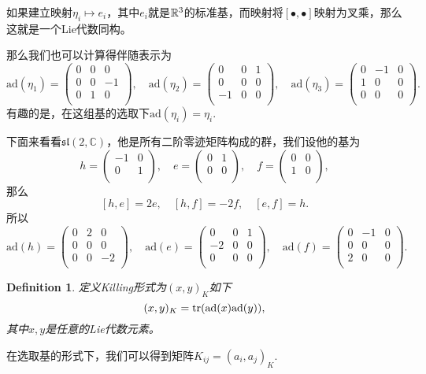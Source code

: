\documentclass[9pt]{extbook}
\theoremstyle{plain}
\newtheorem{defi}{Definition}
\newcommand{\cc}{\mathbb{C}}
\newcommand{\ad}{{\mathrm{ad}}}
\begin{document}
如果建立映射$\eta_i\mapsto e_i$，其中$e_i$就是$\mathbb{R}^3$的标准基，而映射将$[\bullet,\bullet]$映射为叉乘，那么这就是一个Lie代数同构。

那么我们也可以计算得伴随表示为
\[
	\ad(\eta_1)=
		\begin{pmatrix}
			0&0&0\\
			0&0&-1\\
			0&1&0\\
		\end{pmatrix},\quad
	\ad(\eta_2)=
		\begin{pmatrix}
			0&0&1\\
			0&0&0\\
			-1&0&0\\
		\end{pmatrix},\quad
	\ad(\eta_3)=
		\begin{pmatrix}
			0&-1&0\\
			1&0&0\\
			0&0&0\\
		\end{pmatrix}.
\]
有趣的是，在这组基的选取下$\ad(\eta_i)=\eta_i$.

下面来看看$\mathfrak{sl}(2,\cc)$，他是所有二阶零迹矩阵构成的群，我们设他的基为
\[
h=\begin{pmatrix}
	-1&0\\
	0&1\\
\end{pmatrix},\quad
e=\begin{pmatrix}
	0&1\\
	0&0\\
\end{pmatrix},\quad
f=\begin{pmatrix}
	0&0\\
	1&0\\
\end{pmatrix},
\]
那么
\[
[h,e]=2e,\quad[h,f]=-2f,\quad[e,f]=h.
\]
所以
\[
	\ad(h)=
		\begin{pmatrix}
			0&2&0\\
			0&0&0\\
			0&0&-2\\
		\end{pmatrix},\quad
	\ad(e)=
		\begin{pmatrix}
			0&0&1\\
			-2&0&0\\
			0&0&0\\
		\end{pmatrix},\quad
	\ad(f)=
		\begin{pmatrix}
			0&-1&0\\
			0&0&0\\
			2&0&0\\
		\end{pmatrix}.
\]
\begin{defi}
定义Killing形式为$(x,y)_K$如下
\[
	(x,y)_K=\tr(\ad(x)\ad(y)),
\]
其中$x,y$是任意的Lie代数元素。
\end{defi}
在选取基的形式下，我们可以得到矩阵$K_{ij}=(a_i,a_j)_K$.
\end{document}
